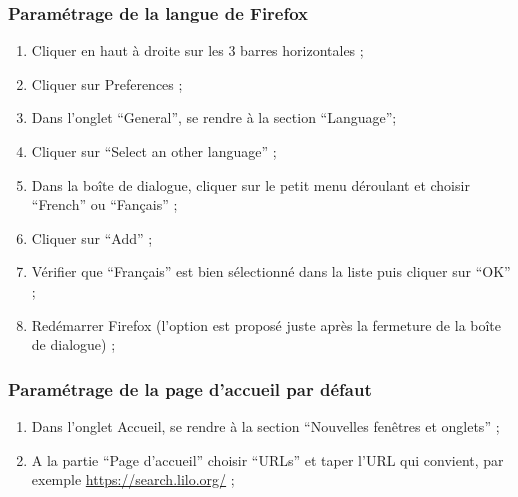 \documentclass[12pt]{article}
\begin{document}
        \subsubsection{Paramétrage de la langue de Firefox}
            \begin{enumerate}
                \item Cliquer en haut à droite sur les 3 barres horizontales ;
                \item Cliquer sur Preferences ;
                \item Dans l’onglet “General”, se rendre à la section “Language”;
                \item Cliquer sur “Select an other language” ;
                \item Dans la boîte de dialogue, cliquer sur le petit menu déroulant et choisir “French” ou “Fançais” ;
                \item Cliquer sur “Add” ;
                \item Vérifier que “Français” est bien sélectionné dans la liste puis cliquer sur “OK” ;
                \item Redémarrer Firefox (l’option est proposé juste après la fermeture de la boîte de dialogue) ;
            \end{enumerate}
        \subsubsection{Paramétrage de la page d'accueil par défaut}
            \begin{enumerate}
                \item Dans l’onglet Accueil, se rendre à la section “Nouvelles fenêtres et onglets” ;
                \item A la partie “Page d’accueil” choisir “URLs” et taper l’URL qui convient, par exemple  \href{https://search.lilo.org/}{https://search.lilo.org/} ;
            \end{enumerate}
\end{document}

